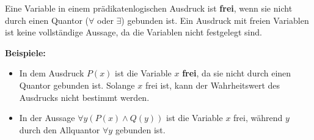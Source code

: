 \documentclass[main.tex]{subfiles}
\begin{document}
\begin{definition}
Eine Variable in einem prädikatenlogischen Ausdruck ist \textbf{frei}, wenn sie nicht durch einen Quantor (\(\forall\) oder \(\exists\)) gebunden ist. Ein Ausdruck mit freien Variablen ist keine vollständige Aussage, da die Variablen nicht festgelegt sind.

\textbf{Beispiele:}
\begin{itemize}
    \item In dem Ausdruck \(P(x)\) ist die Variable \(x\) \textbf{frei}, da sie nicht durch einen Quantor gebunden ist. Solange \(x\) frei ist, kann der Wahrheitswert des Ausdrucks nicht bestimmt werden.
    
    \item In der Aussage \(\forall y (P(x) \land Q(y))\) ist die Variable \(x\) frei, während \(y\) durch den Allquantor \(\forall y\) gebunden ist.
\end{itemize}
\end{definition}
\end{document}
